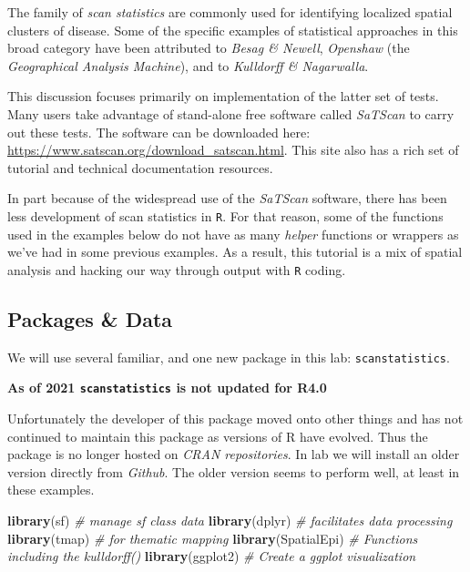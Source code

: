 \documentclass[
]{book}
\newenvironment{Shaded}{\begin{snugshade}}{\end{snugshade}}
\newcommand{\CommentTok}[1]{\textcolor[rgb]{0.56,0.35,0.01}{\textit{#1}}}
\newcommand{\FunctionTok}[1]{\textcolor[rgb]{0.13,0.29,0.53}{\textbf{#1}}}
\newcommand{\NormalTok}[1]{#1}
\newenvironment{rmdcaution}[1]
  {
  \begin{itemize}
  \renewcommand{\labelitemi}{
    \raisebox{-.7\height}[0pt][0pt]{
      {\setkeys{Gin}{width=3em,keepaspectratio}\texttt{[image: images/\#1]}}
    }
  }
  \setlength{\fboxsep}{1em}
  \begin{caution}
  \item
  }
  {
  \end{caution}
  \end{itemize}
  }
\begin{document}
The family of \emph{scan statistics} are commonly used for identifying localized spatial clusters of disease. Some of the specific examples of statistical approaches in this broad category have been attributed to \emph{Besag \& Newell}, \emph{Openshaw} (the \emph{Geographical Analysis Machine}), and to \emph{Kulldorff \& Nagarwalla}.

This discussion focuses primarily on implementation of the latter set of tests. Many users take advantage of stand-alone free software called \emph{SaTScan} to carry out these tests. The software can be downloaded here: \url{https://www.satscan.org/download_satscan.html}. This site also has a rich set of tutorial and technical documentation resources.

In part because of the widespread use of the \emph{SaTScan} software, there has been less development of scan statistics in \texttt{R}. For that reason, some of the functions used in the examples below do not have as many \emph{helper} functions or wrappers as we've had in some previous examples. As a result, this tutorial is a mix of spatial analysis and hacking our way through output with \texttt{R} coding.

\hypertarget{packages-data-2}{%
\subsection{Packages \& Data}\label{packages-data-2}}

We will use several familiar, and one new package in this lab: \texttt{scanstatistics}.

\begin{rmdcaution}{caution}
\textbf{As of 2021 \texttt{scanstatistics} is not updated for R4.0}

Unfortunately the developer of this package moved onto other things and has not continued to maintain this package as versions of R have evolved. Thus the package is no longer hosted on \emph{CRAN repositories}. In lab we will install an older version directly from \emph{Github}. The older version seems to perform well, at least in these examples.

\end{rmdcaution}

\begin{Shaded}
\begin{Highlighting}[]
\FunctionTok{library}\NormalTok{(sf)        }\CommentTok{\# manage sf class data }
\FunctionTok{library}\NormalTok{(dplyr)     }\CommentTok{\# facilitates data processing}
\FunctionTok{library}\NormalTok{(tmap)      }\CommentTok{\# for thematic mapping}
\FunctionTok{library}\NormalTok{(SpatialEpi) }\CommentTok{\# Functions including the kulldorff()}
\FunctionTok{library}\NormalTok{(ggplot2)  }\CommentTok{\# Create a ggplot visualization}
\end{Highlighting}
\end{Shaded}
\end{document}
